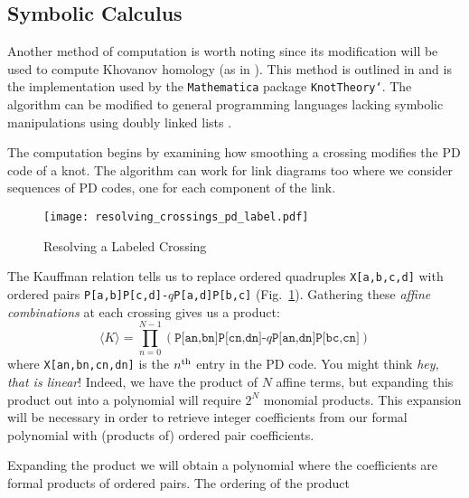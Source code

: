     \subsection{Symbolic Calculus}
        Another method of computation is worth noting since its modification
        will be used to compute Khovanov homology
        (as in \cite{BarNatan2006FASTKH}). This method is outlined in
        \cite{KatlasJones} and is the implementation used by the
        \texttt{Mathematica} package \texttt{KnotTheory`}. The algorithm
        can be modified to general programming languages lacking symbolic
        manipulations using doubly linked lists \cite{MaguireJones}.
        \par\hfill\par
        The computation begins by examining how smoothing a crossing modifies
        the PD code of a knot. The algorithm can work for link diagrams too
        where we consider sequences of PD codes, one for each component of the
        link.
        \begin{figure}
            \centering
            \texttt{[image: resolving\_crossings\_pd\_label.pdf]}
            \caption{Resolving a Labeled Crossing}
            \label{fig:resolving_crossings_pd_label}
        \end{figure}
        The Kauffman relation tells us to replace ordered quadruples
        \texttt{X[a,b,c,d]} with ordered pairs
        \texttt{P[a,b]P[c,d]-$q$P[a,d]P[b,c]}
        (Fig.~\ref{fig:resolving_crossings_pd_label}).
        Gathering these \textit{affine combinations}
        at each crossing gives us a product:
        \begin{equation}
            \langle{K}\rangle
            =\prod_{n=0}^{N-1}(
                \texttt{P[an,bn]P[cn,dn]-$q$P[an,dn]P[bc,cn]}
            )
        \end{equation}
        where \texttt{X[an,bn,cn,dn]} is the
        $n^{\small\textrm{th}}$ entry in the PD code. You might think
        \textit{hey, that is linear}! Indeed, we have the product of
        $N$ affine terms, but expanding this product out into a polynomial
        will require $2^{N}$ monomial products. This expansion will be
        necessary in order to retrieve integer coefficients from our formal
        polynomial with (products of) ordered pair coefficients.
        \par\hfill\par
        Expanding the product we will obtain a polynomial where the coefficients
        are formal products of ordered pairs. The ordering of the product
